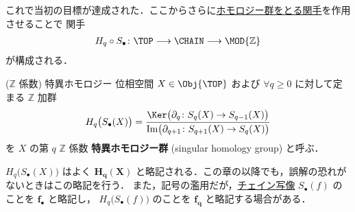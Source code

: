 \documentclass[algtopo_main]{subfiles}
\begin{document}
これで当初の目標が達成された．ここからさらに\hyperref[prop:Hq-functoriality]{ホモロジー群をとる関手}を作用させることで
関手
\begin{align}
    H_q \circ S_\bullet \colon \TOP \lto \CHAIN \lto \MOD{\mathbb{Z}}
\end{align}
が構成される．

\begin{mydef}[label=def:SCC]{($\mathbb{Z}$ 係数) 特異ホモロジー}
    位相空間 $X \in \Obj{\TOP}$ および $\forall q \ge 0$ に対して定まる $\mathbb{Z}$ 加群
    \begin{align}
        H_q \bigl( S_\bullet(X) \bigr) = \frac{\Ker \bigl( \partial_q \colon S_q(X) \to S_{q-1}(X) \bigr) }{\Im \bigl( \partial_{q+1}\colon S_{q+1}(X) \to S_{q}(X) \bigr) }
    \end{align}
    を $X$ の第 $q$ $\mathbb{Z}$ 係数 \textbf{特異ホモロジー群} (singular homology group) と呼ぶ．
\end{mydef}

\begin{marker}
    $H_q \bigl( S_\bullet(X) \bigr)$ はよく $\bm{H_q(X)}$ と略記される．この章の以降でも，誤解の恐れがないときはこの略記を行う．
    また，記号の濫用だが，\hyperref[def:def:chainmap]{チェイン写像} $S_\bullet(f)$ のことを $\bm{f_\bullet}$ と略記し，
    $H_q \bigl( S_\bullet(f) \bigr)$ のことを $\bm{f_q}$ と略記する場合がある．
\end{marker}


\end{document}
